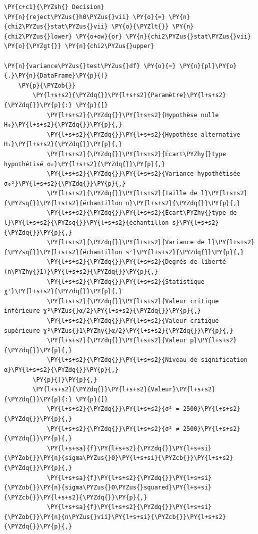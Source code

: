 \begin{tcolorbox}[breakable, size=fbox, boxrule=1pt, pad at break*=1mm,colback=cellbackground, colframe=cellborder]
\begin{Verbatim}[commandchars=\\\{\}]
\PY{c+c1}{\PYZsh{} Decision}
\PY{n}{reject\PYZus{}h0\PYZus{}vii} \PY{o}{=} \PY{n}{chi2\PYZus{}stat\PYZus{}vii} \PY{o}{\PYZlt{}} \PY{n}{chi2\PYZus{}lower} \PY{o+ow}{or} \PY{n}{chi2\PYZus{}stat\PYZus{}vii} \PY{o}{\PYZgt{}} \PY{n}{chi2\PYZus{}upper}

\PY{n}{variance\PYZus{}test\PYZus{}df} \PY{o}{=} \PY{n}{pl}\PY{o}{.}\PY{n}{DataFrame}\PY{p}{(}
    \PY{p}{\PYZob{}}
        \PY{l+s+s2}{\PYZdq{}}\PY{l+s+s2}{Paramètre}\PY{l+s+s2}{\PYZdq{}}\PY{p}{:} \PY{p}{[}
            \PY{l+s+s2}{\PYZdq{}}\PY{l+s+s2}{Hypothèse nulle H₀}\PY{l+s+s2}{\PYZdq{}}\PY{p}{,}
            \PY{l+s+s2}{\PYZdq{}}\PY{l+s+s2}{Hypothèse alternative H₁}\PY{l+s+s2}{\PYZdq{}}\PY{p}{,}
            \PY{l+s+s2}{\PYZdq{}}\PY{l+s+s2}{Écart\PYZhy{}type hypothétisé σ₀}\PY{l+s+s2}{\PYZdq{}}\PY{p}{,}
            \PY{l+s+s2}{\PYZdq{}}\PY{l+s+s2}{Variance hypothétisée σ₀²}\PY{l+s+s2}{\PYZdq{}}\PY{p}{,}
            \PY{l+s+s2}{\PYZdq{}}\PY{l+s+s2}{Taille de l}\PY{l+s+s2}{\PYZsq{}}\PY{l+s+s2}{échantillon n}\PY{l+s+s2}{\PYZdq{}}\PY{p}{,}
            \PY{l+s+s2}{\PYZdq{}}\PY{l+s+s2}{Écart\PYZhy{}type de l}\PY{l+s+s2}{\PYZsq{}}\PY{l+s+s2}{échantillon s}\PY{l+s+s2}{\PYZdq{}}\PY{p}{,}
            \PY{l+s+s2}{\PYZdq{}}\PY{l+s+s2}{Variance de l}\PY{l+s+s2}{\PYZsq{}}\PY{l+s+s2}{échantillon s²}\PY{l+s+s2}{\PYZdq{}}\PY{p}{,}
            \PY{l+s+s2}{\PYZdq{}}\PY{l+s+s2}{Degrés de liberté (n\PYZhy{}1)}\PY{l+s+s2}{\PYZdq{}}\PY{p}{,}
            \PY{l+s+s2}{\PYZdq{}}\PY{l+s+s2}{Statistique χ²}\PY{l+s+s2}{\PYZdq{}}\PY{p}{,}
            \PY{l+s+s2}{\PYZdq{}}\PY{l+s+s2}{Valeur critique inférieure χ²\PYZus{}α/2}\PY{l+s+s2}{\PYZdq{}}\PY{p}{,}
            \PY{l+s+s2}{\PYZdq{}}\PY{l+s+s2}{Valeur critique supérieure χ²\PYZus{}1\PYZhy{}α/2}\PY{l+s+s2}{\PYZdq{}}\PY{p}{,}
            \PY{l+s+s2}{\PYZdq{}}\PY{l+s+s2}{Valeur p}\PY{l+s+s2}{\PYZdq{}}\PY{p}{,}
            \PY{l+s+s2}{\PYZdq{}}\PY{l+s+s2}{Niveau de signification α}\PY{l+s+s2}{\PYZdq{}}\PY{p}{,}
        \PY{p}{]}\PY{p}{,}
        \PY{l+s+s2}{\PYZdq{}}\PY{l+s+s2}{Valeur}\PY{l+s+s2}{\PYZdq{}}\PY{p}{:} \PY{p}{[}
            \PY{l+s+s2}{\PYZdq{}}\PY{l+s+s2}{σ² = 2500}\PY{l+s+s2}{\PYZdq{}}\PY{p}{,}
            \PY{l+s+s2}{\PYZdq{}}\PY{l+s+s2}{σ² ≠ 2500}\PY{l+s+s2}{\PYZdq{}}\PY{p}{,}
            \PY{l+s+sa}{f}\PY{l+s+s2}{\PYZdq{}}\PY{l+s+si}{\PYZob{}}\PY{n}{sigma\PYZus{}0}\PY{l+s+si}{\PYZcb{}}\PY{l+s+s2}{\PYZdq{}}\PY{p}{,}
            \PY{l+s+sa}{f}\PY{l+s+s2}{\PYZdq{}}\PY{l+s+si}{\PYZob{}}\PY{n}{sigma\PYZus{}0\PYZus{}squared}\PY{l+s+si}{\PYZcb{}}\PY{l+s+s2}{\PYZdq{}}\PY{p}{,}
            \PY{l+s+sa}{f}\PY{l+s+s2}{\PYZdq{}}\PY{l+s+si}{\PYZob{}}\PY{n}{n\PYZus{}vii}\PY{l+s+si}{\PYZcb{}}\PY{l+s+s2}{\PYZdq{}}\PY{p}{,}

\end{Verbatim}
\end{tcolorbox}
